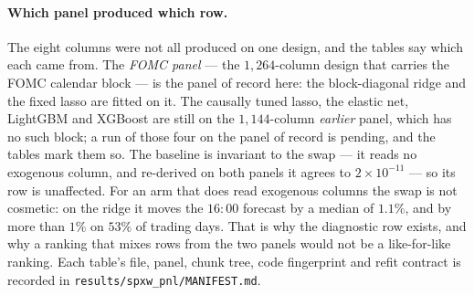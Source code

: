\paragraph{Which panel produced which row.} The eight columns were not
all produced on one design, and the tables say which each came from. The
\emph{FOMC panel} --- the $1{,}264$-column design that carries the FOMC
calendar block --- is the panel of record here: the block-diagonal ridge
and the fixed lasso are fitted on it. The causally tuned lasso, the
elastic net, LightGBM and XGBoost are still on the $1{,}144$-column
\emph{earlier} panel, which has no such block; a run of those four on the
panel of record is pending, and the tables mark them so. The baseline is
invariant to the swap --- it reads no exogenous column, and re-derived on
both panels it agrees to $2\times 10^{-11}$ --- so its row is unaffected.
For an arm that does read exogenous columns the swap is not cosmetic: on
the ridge it moves the $16{:}00$ forecast by a median of $1.1\%$, and by
more than $1\%$ on $53\%$ of trading days. That is why the diagnostic row
exists, and why a ranking that mixes rows from the two panels would not be
a like-for-like ranking. Each table's file, panel, chunk tree, code
fingerprint and refit contract is recorded in
\texttt{results/spxw\_pnl/MANIFEST.md}.

